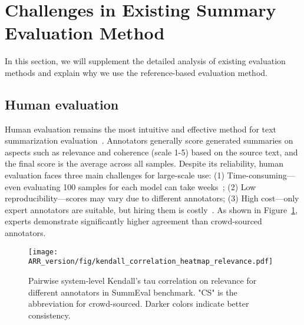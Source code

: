 \section{Challenges in Existing Summary Evaluation Method}
\label{sec:appendix}
In this section, we will supplement the detailed analysis of existing evaluation methods and explain why we use the reference-based evaluation method.

\subsection{Human evaluation}
Human evaluation remains the most intuitive and effective method for text summarization evaluation~\cite{fabbri2021summeval,pu2023summarization,liu2023benchmarking,zhang2024benchmarking}. Annotators generally score generated summaries on aspects such as relevance and coherence (scale 1-5) based on the source text, and the final score is the average across all samples. Despite its reliability, human evaluation faces three main challenges for large-scale use: (1) Time-consuming—even evaluating 100 samples for each model can take weeks~\cite{zhang2024benchmarking}; (2) Low reproducibility—scores may vary due to different annotators; (3) High cost—only expert annotators are suitable, but hiring them is costly~\cite{fabbri2021summeval}. As shown in Figure~\ref{fig:kd_heatmap_relevance}, experts demonstrate significantly higher agreement than crowd-sourced annotators.

\begin{figure}
    \centering
    \texttt{[image: ARR\_version/fig/kendall\_correlation\_heatmap\_relevance.pdf]}
    \caption{Pairwise system-level Kendall’s tau correlation on relevance for different annotators in SummEval benchmark. "CS" is the abbreviation for crowd-sourced. Darker colors indicate better consistency. }
    \label{fig:kd_heatmap_relevance}
\end{figure}



